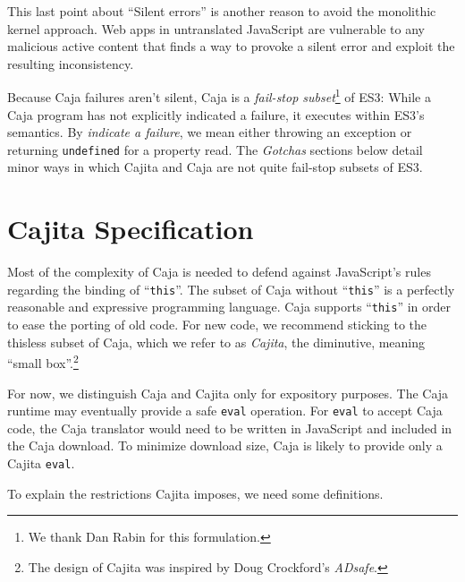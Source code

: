 \documentclass[letterpaper,twocolumn,10pt]{article}
\newcommand{\code}[1]{{\tt {#1}}}              %
\begin{document}
This last point about ``Silent errors'' is another reason to avoid the 
monolithic kernel approach. Web apps in untranslated JavaScript are 
vulnerable to any malicious active content that finds a way to provoke a 
silent error and exploit the resulting inconsistency.

Because Caja failures aren't silent, Caja is a \emph{fail-stop 
subset}\footnote{
%
We thank Dan Rabin for this formulation.
%
} of ES3: While a Caja program has not explicitly indicated a failure, 
it executes within ES3's semantics. By \emph{indicate a failure}, we 
mean either throwing an exception or returning \code{undefined} for a 
property read. The \emph{Gotchas} sections below detail minor ways in which 
Cajita and Caja are not quite fail-stop subsets of ES3.


\section{Cajita Specification}
\label{sec:cajita-spec}

Most of the complexity of Caja is needed to defend against JavaScript's rules 
regarding the binding of ``\code{this}''. The subset of Caja without 
``\code{this}'' is a perfectly reasonable and expressive programming 
language. Caja supports ``\code{this}'' in order to ease the porting of old 
code. For new code, we recommend sticking to the thisless subset of Caja, 
which we refer to as \emph{Cajita}, the diminutive, meaning ``small 
box''.\footnote{
%
The design of Cajita was inspired by Doug Crockford's \emph{ADsafe}.
%
}

For now, we distinguish Caja and Cajita only for expository purposes. The 
Caja runtime may eventually provide a safe \code{eval} operation. For 
\code{eval} to accept Caja code, the Caja translator would need to be written 
in JavaScript and included in the Caja download. To minimize download size, 
Caja is likely to provide only a Cajita \code{eval}.

To explain the restrictions Cajita imposes, we need some definitions.
\end{document}
